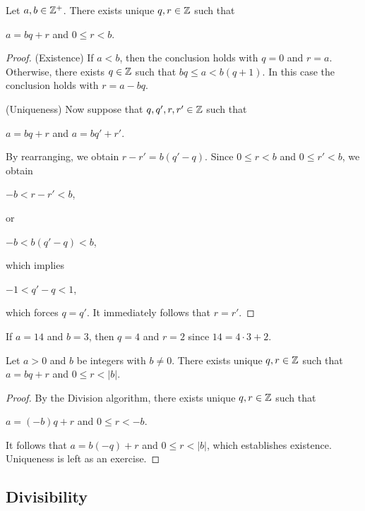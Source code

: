 \documentclass[11pt,fleqn,dvipsnames,usenames]{article}
\newcommand{\p}{\noindent}
\begin{document}
\begin{theorem} Let $a,b\in\mathbb{Z}^{+}$.  There exists unique $q,r\in\mathbb{Z}$ such that
\begin{center}
$a = bq + r$ and $0\leq r < b$.
\end{center}
\end{theorem}
%
\begin{proof}

(Existence) If $a < b$, then the conclusion holds with $q = 0$ and $r = a$.  Otherwise, there exists $q\in\mathbb{Z}$ such that $bq \leq a < b(q + 1)$.  In this case the conclusion holds with $r = a - bq$.
\vsp

\p (Uniqueness) Now suppose that $q, q', r, r'\in \mathbb{Z}$ such that
\begin{center}
$a = bq + r$ and $a = bq' + r'$.
\end{center}
By rearranging, we obtain $r - r' = b(q' - q)$.  Since $0 \leq r < b$ and $0 \leq r' < b$, we obtain
\begin{center}
$-b < r - r' < b$,
\end{center}
or
\begin{center}
$-b < b(q' - q) < b$,
\end{center}
which implies
\begin{center}
$-1 < q' - q < 1$,
\end{center}
which forces $q = q'$.  It immediately follows that $r = r'$.
\end{proof}
%
\begin{example}
If $a = 14$ and $b=3$, then $q = 4$ and $r = 2$ since $14 = 4\cdot 3 + 2$.
\end{example}
\vsmsp

%
\begin{corollary} Let $a > 0$ and $b$ be integers with $b\neq 0$.  There exists unique $q,r\in\mathbb{Z}$ such that $a = bq + r$ and $0\leq r < |b|$.
\end{corollary}

\begin{proof} By the Division algorithm, there exists unique $q,r\in \mathbb{Z}$ such that
\begin{center}
$a = (-b)q + r$ and $0 \leq r < -b$.  
\end{center}
It follows that $a = b(-q) + r$ and $0\leq r < |b|$, which establishes existence.  Uniqueness is left as an exercise.
\end{proof}

\subsection{Divisibility}
\end{document}

